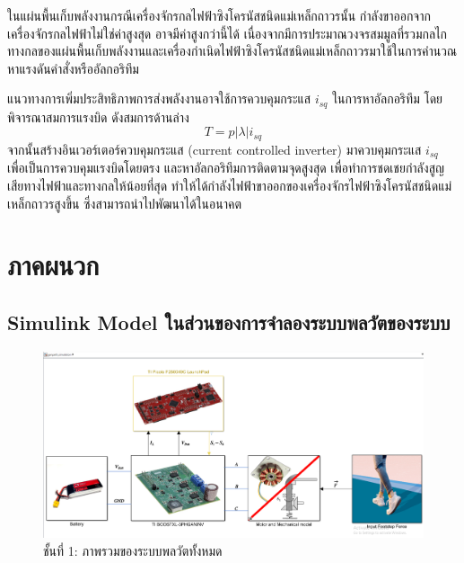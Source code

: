 \documentclass[11pt,a4paper]{article}
\begin{document}
ในแผ่นพื้นเก็บพลังงานกรณีเครื่องจักรกลไฟฟ้าซิงโครนัสชนิดแม่เหล็กถาวรนั้น กำลังขาออกจากเครื่องจักรกลไฟฟ้าไม่ใช่ค่าสูงสุด อาจมีค่าสูงกว่านี้ได้ เนื่องจากมีการประมาณวงจรสมมูลที่รวมกลไกทางกลของแผ่นพื้นเก็บพลังงานและเครื่องกำเนิดไฟฟ้าซิงโครนัสชนิดแม่เหล็กถาวรมาใช้ในการคำนวณหาแรงดันคำสั่งหรืออัลกอริทึม 

แนวทางการเพิ่มประสิทธิภาพการส่งพลังงานอาจใช้การควบคุมกระแส $i_{sq}$ ในการหาอัลกอริทึม โดยพิจารณาสมการแรงบิด ดังสมการด้านล่าง
\begin{equation}
    T = p|\lambda|i_{sq}
\end{equation}
จากนั้นสร้างอินเวอร์เตอร์ควบคุมกระแส (current controlled inverter) มาควบคุมกระแส $i_{sq}$ เพื่อเป็นการควบคุมแรงบิดโดยตรง และหาอัลกอริทึมการติดตามจุดสูงสุด เพื่อทำการชดเชยกำลังสูญเสียทางไฟฟ้าและทางกลให้น้อยที่สุด ทำให้ได้กำลังไฟฟ้าขาออกของเครื่องจักรไฟฟ้าซิงโครนัสชนิดแม่เหล็กถาวรสูงขึ้น ซึ่งสามารถนำไปพัฒนาได้ในอนาคต 






\section{ภาคผนวก}

\subsection{Simulink Model ในส่วนของการจำลองระบบพลวัตของระบบ}

\begin{figure}[H]
    \centering
    \includegraphics[width=\textwidth]{layer0.png}
    \caption{ชั้นที่ 1: ภาพรวมของระบบพลวัตทั้งหมด}
\end{figure}
\end{document}
